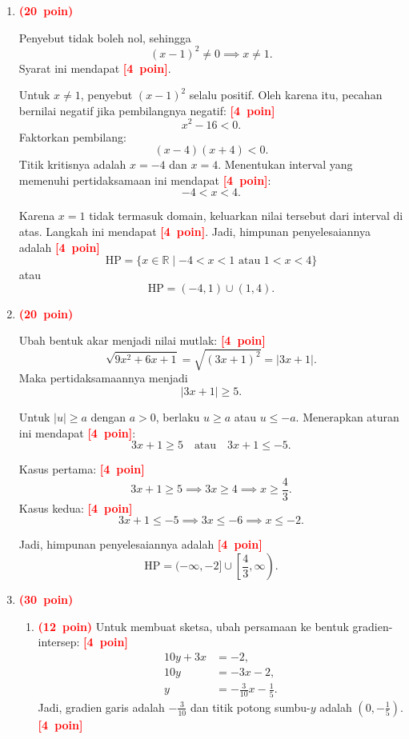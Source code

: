 \documentclass[12pt,a4paper]{article}
\newcommand{\bobot}[1]{\mbox{\textcolor{red}{\textbf{(#1 poin)}}}}
\newcommand{\poin}[1]{\mbox{\textcolor{red}{\textbf{[#1 poin]}}}}
\begin{document}
\begin{enumerate}
  \item \bobot{20}

        Penyebut tidak boleh nol, sehingga
        \[
          (x-1)^2\neq 0\implies x\neq 1.
        \]
        Syarat ini mendapat \poin{4}.

        Untuk $x\neq 1$, penyebut $(x-1)^2$ selalu positif. Oleh karena itu,
        pecahan bernilai negatif jika pembilangnya negatif:
        \poin{4}
        \[
          x^2-16<0.
        \]
        Faktorkan pembilang:
        \[
          (x-4)(x+4)<0.
        \]
        Titik kritisnya adalah $x=-4$ dan $x=4$. Menentukan interval yang
        memenuhi pertidaksamaan ini mendapat \poin{4}:
        \[
          -4<x<4.
        \]

        Karena $x=1$ tidak termasuk domain, keluarkan nilai tersebut dari
        interval di atas. Langkah ini mendapat \poin{4}. Jadi, himpunan
        penyelesaiannya adalah \poin{4}
        \[
          \boxed{\mathrm{HP}=\{x\in\mathbb{R}\mid -4<x<1
          \text{ atau }1<x<4\}}
        \]
        atau
        \[
          \boxed{\mathrm{HP}=(-4,1)\cup(1,4)}.
        \]

  \item \bobot{20}

        Ubah bentuk akar menjadi nilai mutlak:
        \poin{4}
        \[
          \sqrt{9x^2+6x+1}
          =\sqrt{(3x+1)^2}=|3x+1|.
        \]
        Maka pertidaksamaannya menjadi
        \[
          |3x+1|\geq 5.
        \]

        Untuk $|u|\geq a$ dengan $a>0$, berlaku $u\geq a$ atau $u\leq-a$.
        Menerapkan aturan ini mendapat \poin{4}:
        \[
          3x+1\geq 5
          \quad\text{atau}\quad
          3x+1\leq -5.
        \]

        Kasus pertama:
        \poin{4}
        \[
          3x+1\geq 5
          \implies 3x\geq 4
          \implies x\geq \frac{4}{3}.
        \]
        Kasus kedua:
        \poin{4}
        \[
          3x+1\leq -5
          \implies 3x\leq -6
          \implies x\leq -2.
        \]

        Jadi, himpunan penyelesaiannya adalah \poin{4}
        \[
          \boxed{\mathrm{HP}=(-\infty,-2]\cup
          \left[\frac{4}{3},\infty\right)}.
        \]

  \item \bobot{30}

        \begin{enumerate}[label=\alph*.]
          \item \bobot{12} Untuk membuat sketsa, ubah persamaan ke bentuk
                gradien-intersep:
                \poin{4}
                \begin{align*}
                  10y+3x&=-2,\\
                  10y&=-3x-2,\\
                  y&=-\frac{3}{10}x-\frac{1}{5}.
                \end{align*}
                Jadi, gradien garis adalah $-\frac{3}{10}$ dan titik potong
                sumbu-$y$ adalah $(0,-\frac15)$. \poin{4}


\end{enumerate}
\end{enumerate}
\end{document}
